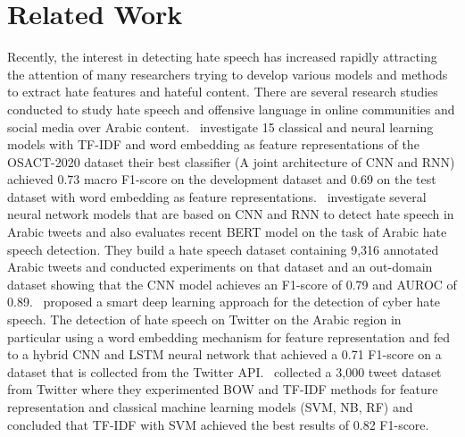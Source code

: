 \documentclass[conference]{IEEEtran}
\begin{document}
\section{Related Work}

Recently, the interest in detecting hate speech has increased rapidly attracting the attention of many researchers trying to develop various models and methods to extract hate features and hateful content. There are several research studies conducted to study hate speech and offensive language in online communities and social media over Arabic content.~\cite{abuzayed2020quick} investigate 15 classical and neural learning models with TF-IDF and word embedding as feature representations of the OSACT-2020 dataset their best classifier (A joint architecture of CNN and RNN) achieved 0.73 macro F1-score on the development dataset and 0.69 on the test dataset with word embedding as feature representations.~\cite{alshaalan2020hate} investigate several neural network models that are based on CNN and RNN to detect hate speech in Arabic tweets and also evaluates recent BERT model on the task of Arabic hate speech detection. They build a hate speech dataset containing 9,316 annotated Arabic tweets and conducted experiments on that dataset and an out-domain dataset showing that the CNN model achieves an F1-score of 0.79 and AUROC of 0.89.~\cite{faris2020hate} proposed a smart deep learning approach for the detection of cyber hate speech. The detection of hate speech on Twitter on the Arabic region in particular using a word embedding mechanism for feature representation and fed to a hybrid CNN and LSTM neural network that achieved a 0.71 F1-score on a dataset that is collected from the Twitter API.~\cite{al2020hate} collected a 3,000 tweet dataset from Twitter where they experimented BOW and TF-IDF methods for feature representation and classical machine learning models (SVM, NB, RF) and concluded that TF-IDF with SVM achieved the best results of 0.82 F1-score.
\end{document}

